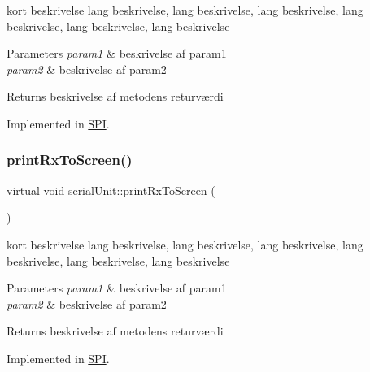 kort beskrivelse lang beskrivelse, lang beskrivelse, lang beskrivelse, lang beskrivelse, lang beskrivelse, lang beskrivelse 


\begin{DoxyParams}{Parameters}
{\em param1} & beskrivelse af param1 \\
\hline
{\em param2} & beskrivelse af param2 \\
\hline
\end{DoxyParams}
\begin{DoxyReturn}{Returns}
beskrivelse af metodens returværdi 
\end{DoxyReturn}


Implemented in \hyperlink{classSPI_ad468d421e9c82453957c5ee7ea7d5b9d}{S\+PI}.

\mbox{\label{classserialUnit_a3d529e2d2c5908ecf8106ff796e4c3eb}} 
\subsubsection{\texorpdfstring{print\+Rx\+To\+Screen()}{printRxToScreen()}}
{\footnotesize\ttfamily virtual void serial\+Unit\+::print\+Rx\+To\+Screen (\begin{DoxyParamCaption}{ }\end{DoxyParamCaption})\hspace{0.3cm}{\ttfamily [pure virtual]}}



kort beskrivelse lang beskrivelse, lang beskrivelse, lang beskrivelse, lang beskrivelse, lang beskrivelse, lang beskrivelse 


\begin{DoxyParams}{Parameters}
{\em param1} & beskrivelse af param1 \\
\hline
{\em param2} & beskrivelse af param2 \\
\hline
\end{DoxyParams}
\begin{DoxyReturn}{Returns}
beskrivelse af metodens returværdi 
\end{DoxyReturn}


Implemented in \hyperlink{classSPI_a33d7fcfab7e5962dd1392aecfd58eaca}{S\+PI}.

\mbox{\label{classserialUnit_a48e5dcf17a5a551351d7569c43cf96ad}} 
